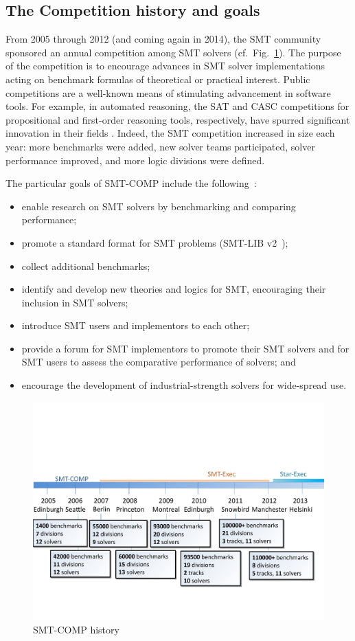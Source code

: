 \documentclass{eptcs}
\begin{document}
\subsection{The Competition history and goals}
From 2005 through 2012 (and coming again in 2014), the SMT community
sponsored an annual competition among SMT solvers
(cf.\ Fig.~\ref{Fig:history}).  The purpose of the competition is to
encourage advances in SMT solver implementations acting on benchmark
formulas of theoretical or practical interest.  Public competitions
are a well-known means of stimulating advancement in software tools.
For example, in automated reasoning, the SAT and CASC competitions for
propositional and first-order reasoning tools, respectively, have
spurred significant innovation in their fields
\cite{leberre+03,PSS02}.  Indeed, the SMT competition increased in
size each year: more benchmarks were added, new solver teams
participated, solver performance improved, and more logic divisions were defined.

The particular goals of SMT-COMP include the following~\cite{smtcompweb}:
\begin{itemize}[noitemsep]
\item enable research on SMT solvers by benchmarking and comparing performance;
\item promote a standard format for SMT problems (SMT-LIB v2~\cite{BarST-SMT-10});
\item collect additional benchmarks;
\item identify and develop new theories and logics for SMT, encouraging their inclusion in SMT solvers;
\item introduce SMT users and implementors to each other;
\item provide a forum for SMT implementors to promote their SMT solvers and for SMT users to assess the comparative performance of solvers; and
\item encourage the development of industrial-strength solvers for wide-spread use.
\end{itemize}

\begin{figure}
\centering
\includegraphics[width=.95\textwidth, viewport=0 85 720 370, clip=true]{SMTCOMP-History}
\caption{SMT-COMP history}
\label{Fig:history}
\end{figure}
\end{document}
